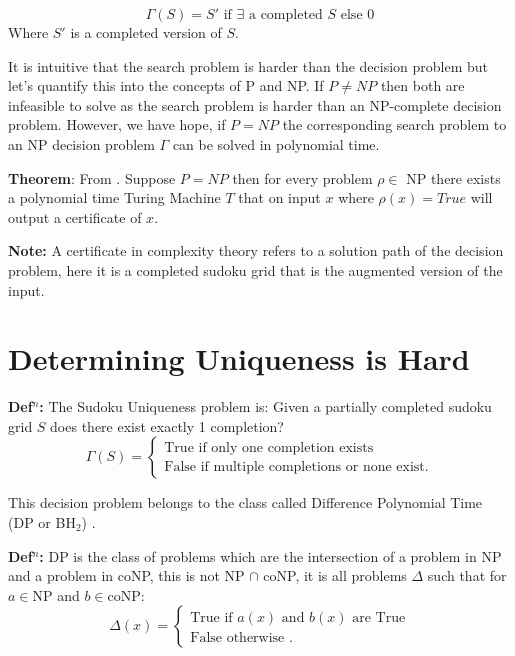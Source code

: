 \documentclass[a4paper,11pt]{report}
\begin{document}
\begin{equation}
\Gamma(S) =  S' \text{ if $\exists$ a completed $S$ else 0}
\end{equation}
Where $S'$ is a completed version of $S$.

It is intuitive that the search problem is harder than the decision problem but let's quantify this into the concepts of P and NP. If $P \neq NP$ then both are infeasible to solve as the search problem is harder than an NP-complete decision problem. However, we have hope, if $P=NP$ the corresponding search problem to an NP decision problem $\Gamma$ can be solved in polynomial time. 

\textbf{Theorem}: From \cite{compcomplexityamodernapproach}. Suppose $P=NP$ then for every problem $\rho\in$ NP there exists a polynomial time Turing Machine $T$ that on input $x$ where $\rho(x)=True$ will output a certificate of $x$.

\textbf{Note:} A certificate in complexity theory refers to a solution path of the decision problem, here it is a completed sudoku grid that is the augmented version of the input. 

\section{Determining Uniqueness is Hard}

\textbf{Def$^n$:} The Sudoku Uniqueness problem is: Given a partially completed sudoku grid $S$ does there exist exactly 1 completion?
		\begin{equation}
		        \Gamma (S) = \begin{cases}
		            \text{True if only one completion exists} \\
		            \text{False if multiple completions or none exist}.
				\end{cases}
		\end{equation}

This decision problem belongs to the class called Difference Polynomial Time (DP or BH$_2$) \cite{dpcomplexity}.

\textbf{Def$^n$:} DP is the class of problems which are the intersection of a problem in NP and a problem in coNP, this is not NP $\cap$ coNP, it is all problems $\Delta$ such that for $a \in $NP and $b\in $coNP:
		\begin{equation}
		        \Delta (x) = \begin{cases}
		            \text{True if $a(x)$ and $b(x)$ are True} \\
		            \text{False otherwise }.
				\end{cases}
		\end{equation}
\end{document}
